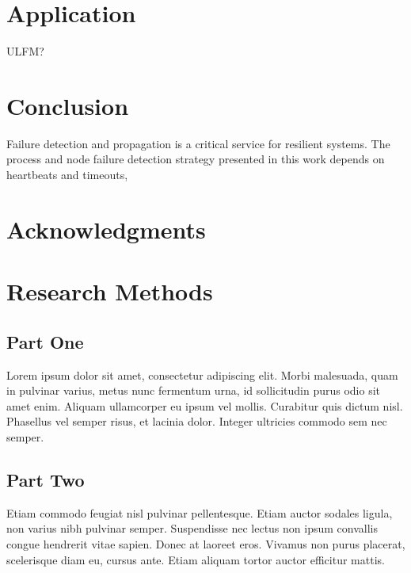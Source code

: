 \documentclass[sigconf]{acmart}
\begin{document}
\section{Application}
ULFM?

\section{Conclusion}
Failure detection and propagation is a critical service for resilient systems. The process and node failure detection strategy presented in this work depends on heartbeats and timeouts, 

\section{Acknowledgments}

%
\begin{acks}
\end{acks}

%



% 
\appendix

\section{Research Methods}

\subsection{Part One}

Lorem ipsum dolor sit amet, consectetur adipiscing elit. Morbi malesuada, quam in pulvinar varius, metus nunc fermentum urna, id sollicitudin purus odio sit amet enim. Aliquam ullamcorper eu ipsum vel mollis. Curabitur quis dictum nisl. Phasellus vel semper risus, et lacinia dolor. Integer ultricies commodo sem nec semper. 

\subsection{Part Two}

Etiam commodo feugiat nisl pulvinar pellentesque. Etiam auctor sodales ligula, non varius nibh pulvinar semper. Suspendisse nec lectus non ipsum convallis congue hendrerit vitae sapien. Donec at laoreet eros. Vivamus non purus placerat, scelerisque diam eu, cursus ante. Etiam aliquam tortor auctor efficitur mattis. 
\end{document}
